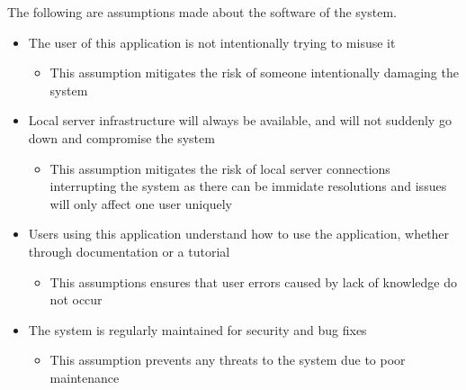 \documentclass{article}
\begin{document}
The following are assumptions made about the software of the system. 
\begin{itemize}
    \item The user of this application is not intentionally trying to misuse it
    \begin{itemize}
        \item This assumption mitigates the risk of someone intentionally
        damaging the system
    \end{itemize}
    \item Local server infrastructure will always be available, and will not suddenly
    go down and compromise the system
    \begin{itemize}
        \item This assumption mitigates the risk of local server connections
        interrupting the system as there can be immidate resolutions and issues
        will only affect one user uniquely
    \end{itemize}
    \item Users using this application understand how to use the application,
    whether through documentation or a tutorial
    \begin{itemize}
        \item This assumptions ensures that user errors caused by lack of
        knowledge do not occur
    \end{itemize}
    \item The system is regularly maintained for security and bug fixes
    \begin{itemize}
        \item This assumption prevents any threats to the system due to poor
        maintenance
    \end{itemize}
\end{itemize}
\end{document}
